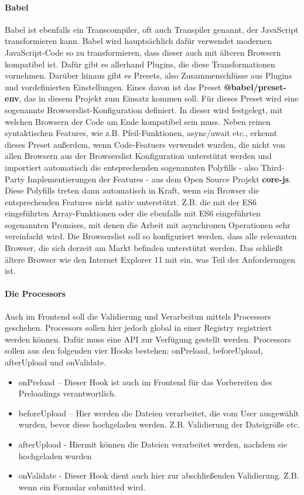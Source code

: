 \paragraph{Babel} Babel ist ebenfalls ein Transcompiler, oft auch Transpiler genannt, der JavaScript transformieren kann. Babel wird hauptsächlich dafür verwendet modernen JavaScript-Code so zu transformieren, dass dieser auch mit älteren Browsern kompatibel ist. Dafür gibt es allerhand Plugins, die diese Transformationen vornehmen. Darüber hinaus gibt es Presets, also Zusammenschlüsse aus Plugins und vordefinierten Einstellungen. Eines davon ist das Preset \textbf{@babel/preset-env}, das in diesem Projekt zum Einsatz kommen soll. Für dieses Preset wird eine sogenannte Browserslist-Konfiguration definiert. In dieser wird festgelegt, mit welchen Browsern der Code am Ende kompatibel sein muss. Neben reinen syntaktischen Features, wie z.B. Pfeil-Funktionen, async/await etc., erkennt dieses Preset außerdem, wenn Code-Featuers verwendet wurden, die nicht von allen Browsern aus der Browserslist Konfiguration unterstützt werden und importiert automatisch die entsprechenden sogenannten Polyfills - also Third-Party Implementierungen der Features - aus dem Open Source Projekt \textbf{core-js}. Diese Polyfills treten dann automatisch in Kraft, wenn ein Browser die entsprechenden Features nicht nativ unterstützt. Z.B. die mit der \ac{ES6} eingeführten Array-Funktionen oder die ebenfalls mit ES6 eingeführten sogenannten Promises, mit denen die Arbeit mit asynchronen Operationen sehr vereinfacht wird. Die Browserslist soll so konfiguriert werden, dass alle relevanten Browser, die sich derzeit am Markt befinden unterstützt werden. Das schließt ältere Browser wie den Internet Explorer 11 mit ein, was Teil der Anforderungen ist. 

\paragraph{Die Processors} Auch im Frontend soll die Validierung und Verarbeitun mittels Processors geschehen. Processors sollen hier jedoch global in einer Registry registriert werden können. Dafür muss eine API zur Verfügung gestellt werden. Processors sollen aus den folgenden vier Hooks bestehen: onPreload, beforeUpload, afterUpload und onValidate.

\begin{itemize}
	\item onPreload 	– Dieser Hook ist auch im Frontend für das Vorbereiten des Preloadings verantwortlich.
	\item beforeUpload 	– Hier werden die Dateien verarbeitet, die vom User ausgewählt wurden, bevor diese hochgeladen werden. Z.B. Validierung der Dateigröße etc.
	\item afterUpload 	- Hiermit können die Dateien verarbeitet werden, nachdem sie hochgeladen wurden
	\item onValidate	- Dieser Hook dient auch hier zur abschließenden Validierung. Z.B. wenn ein Formular submitted wird.
\end{itemize}

